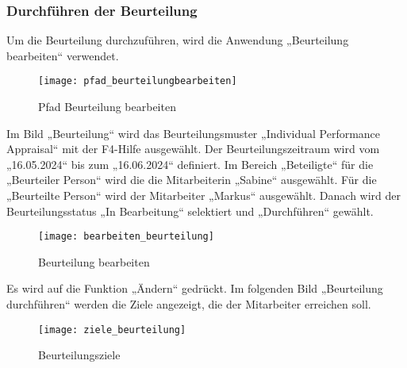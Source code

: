 \subsubsection{Durchführen der Beurteilung}
Um die Beurteilung durchzuführen, wird die Anwendung „Beurteilung bearbeiten“ verwendet.
\begin{figure}[H]
	\centering
	\texttt{[image: pfad\_beurteilungbearbeiten]}
	\caption{Pfad Beurteilung bearbeiten}
	\label{fig:pfad_beurteilungbearbeiten}
\end{figure}
Im Bild „Beurteilung“ wird das Beurteilungsmuster „Individual Performance Appraisal“ mit der F4-Hilfe ausgewählt. Der Beurteilungszeitraum wird vom „16.05.2024“ bis zum „16.06.2024“ definiert. Im Bereich „Beteiligte“ für die „Beurteiler Person“ wird die die Mitarbeiterin „Sabine“ ausgewählt. Für die „Beurteilte Person“ wird der Mitarbeiter „Markus“ ausgewählt. Danach wird der Beurteilungsstatus „In Bearbeitung“ selektiert und „Durchführen“ gewählt.
\begin{figure}[H]
	\centering
	\texttt{[image: bearbeiten\_beurteilung]}
	\caption{Beurteilung bearbeiten}
	\label{fig:bearbeiten_beurteilung}
\end{figure}
Es wird auf die Funktion „Ändern“ gedrückt. Im folgenden Bild „Beurteilung durchführen“ werden die Ziele angezeigt, die der Mitarbeiter erreichen soll.
\begin{figure}[H]
	\centering
	\texttt{[image: ziele\_beurteilung]}
	\caption{Beurteilungsziele}
	\label{fig:ziele_beurteilung}
\end{figure}

